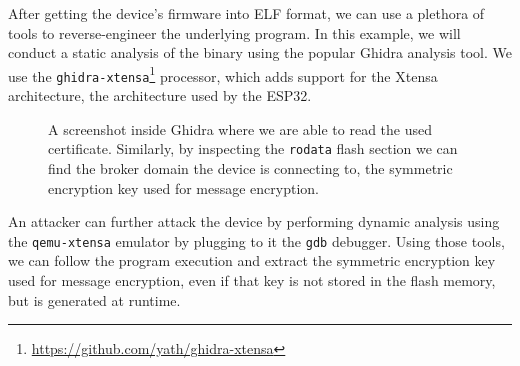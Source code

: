 \documentclass[conference]{IEEEtran}
\begin{document}
After getting the device's firmware into ELF format, we can use a plethora of tools 
to reverse-engineer the underlying program. 
In this example, we will conduct a static analysis of the binary using the popular Ghidra\cite{Ghidra, GhidraBook} analysis tool.
We use the \texttt{ghidra-xtensa}\footnote{\url{https://github.com/yath/ghidra-xtensa}} processor,
which adds support for the Xtensa architecture, the architecture used by the ESP32.

\begin{figure}[h]
    \centering
    \caption{A screenshot inside Ghidra where we are able to read the used certificate. Similarly, 
    by inspecting the \texttt{rodata} flash section we can find the broker domain the device is connecting to, the 
    symmetric encryption key used for message encryption.}
    \label{fig:ghidra}
\end{figure}

An attacker can further attack the device by performing dynamic analysis using the \texttt{qemu-xtensa} emulator
by plugging to it the \texttt{gdb} debugger. 
Using those tools, we can follow the program execution and extract the symmetric encryption key used for message encryption, 
even if that key is not stored in the flash memory, but is generated at runtime.
\end{document}
